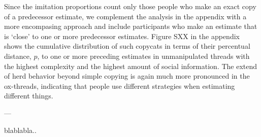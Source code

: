 \documentclass[10pt,a4paper,twocolumn,lineno]{article}
\begin{document}
Since the imitation proportions count only those people who make an exact copy of a predecessor estimate, we complement the analysis in the appendix with a more encompasing approach and include participants who make an estimate that is `close' to one or more predecessor estimates. Figure SXX in the appendix shows the cumulative distribution of such copycats in terms of their percentual distance, $p$, to one or more preceding estimates in unmanipulated threads with the highest complexity and the highest amount of social information. The extend of herd behavior beyond simple copying is again much more pronounced in the ox-threads, indicating that people use different strategies when estimating different things. 

---

blablabla..
\end{document}
